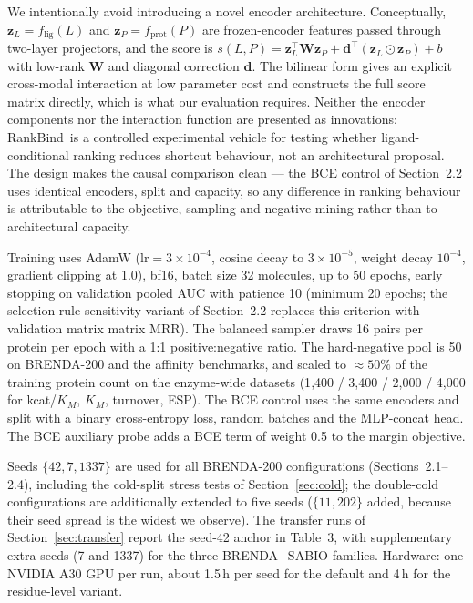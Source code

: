 \documentclass[11pt,a4paper]{article}
\newcommand{\method}{RankBind\xspace}
\newcommand{\mrr}{matrix MRR}
\begin{document}
We intentionally avoid introducing a novel encoder architecture. Conceptually,
$\mathbf{z}_L = f_{\mathrm{lig}}(L)$ and $\mathbf{z}_P =
f_{\mathrm{prot}}(P)$ are frozen-encoder features passed through two-layer
projectors, and the score is $s(L,P) = \mathbf{z}_L^\top \mathbf{W}
\mathbf{z}_P + \mathbf{d}^\top(\mathbf{z}_L \odot \mathbf{z}_P) + b$ with
low-rank $\mathbf{W}$ and diagonal correction $\mathbf{d}$. The bilinear
form gives an explicit cross-modal interaction at low parameter cost and
constructs the full score matrix directly, which is what our evaluation
requires. Neither the encoder components nor the interaction function are
presented as innovations: \method\ is a controlled experimental vehicle for
testing whether ligand-conditional ranking reduces shortcut behaviour, not
an architectural proposal. The design makes the causal comparison clean ---
the BCE control of Section~2.2 uses identical encoders, split and capacity,
so any difference in ranking behaviour is attributable to the objective,
sampling and negative mining rather than to architectural capacity.

Training uses AdamW ($\mathrm{lr} = 3\times10^{-4}$, cosine decay to
$3\times10^{-5}$, weight decay $10^{-4}$, gradient clipping at 1.0), bf16,
batch size 32 molecules, up to 50 epochs, early stopping on validation
pooled AUC with patience 10 (minimum 20 epochs; the selection-rule
sensitivity variant of Section~2.2 replaces this criterion with validation
matrix \mrr{}). The balanced sampler draws
16 pairs per protein per epoch with a 1:1 positive:negative ratio. The
hard-negative pool is 50 on BRENDA-200 and the affinity benchmarks, and
scaled to $\approx 50\%$ of the training protein count on the enzyme-wide
datasets (1{,}400 / 3{,}400 / 2{,}000 / 4{,}000 for kcat/$K_M$, $K_M$,
turnover, ESP). The BCE control uses the same encoders and split with a
binary cross-entropy loss, random batches and the MLP-concat head. The BCE
auxiliary probe adds a BCE term of weight 0.5 to the margin objective.

Seeds $\{42, 7, 1337\}$ are used for all BRENDA-200 configurations
(Sections~2.1--2.4), including the cold-split stress tests of
Section~\ref{sec:cold}; the double-cold configurations are additionally
extended to five seeds ($\{11, 202\}$ added, because their seed spread is
the widest we observe). The transfer runs of Section~\ref{sec:transfer}
report the seed-42 anchor in Table~3, with supplementary extra seeds (7 and
1337) for the three BRENDA+SABIO families. Hardware: one NVIDIA A30 GPU per run, about 1.5\,h per seed for the
default and 4\,h for the residue-level variant.
\end{document}
